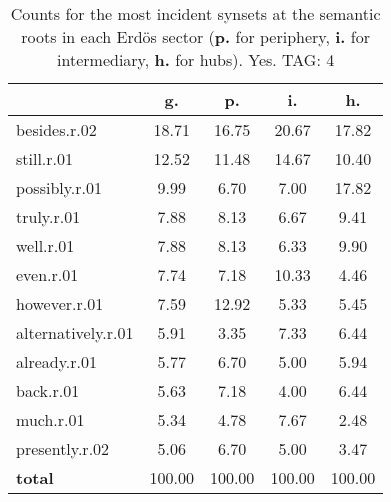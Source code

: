 \begin{table}[h!]
\begin{center}
\begin{tabular}{| l || c | c | c | c |}\hline
 & {\bf g.} & {\bf p.} & {\bf i.} & {\bf h.} \\\hline\hline
besides.r.02 & 18.71  & 16.75  & 20.67  & 17.82 \\\hline
still.r.01 & 12.52  & 11.48  & 14.67  & 10.40 \\\hline
possibly.r.01 & 9.99  & 6.70  & 7.00  & 17.82 \\\hline
truly.r.01 & 7.88  & 8.13  & 6.67  & 9.41 \\\hline
well.r.01 & 7.88  & 8.13  & 6.33  & 9.90 \\\hline
even.r.01 & 7.74  & 7.18  & 10.33  & 4.46 \\\hline
however.r.01 & 7.59  & 12.92  & 5.33  & 5.45 \\\hline
alternatively.r.01 & 5.91  & 3.35  & 7.33  & 6.44 \\\hline
already.r.01 & 5.77  & 6.70  & 5.00  & 5.94 \\\hline
back.r.01 & 5.63  & 7.18  & 4.00  & 6.44 \\\hline
much.r.01 & 5.34  & 4.78  & 7.67  & 2.48 \\\hline
presently.r.02 & 5.06  & 6.70  & 5.00  & 3.47 \\\hline\hline
{{\bf total}} & 100.00  & 100.00  & 100.00  & 100.00 \\\hline
\end{tabular}
\caption{Counts for the most incident synsets at the semantic roots in each Erd\"os sector ({\bf p.} for periphery, {\bf i.} for intermediary, {\bf h.} for hubs). Yes. TAG: 4}
\end{center}
\end{table}